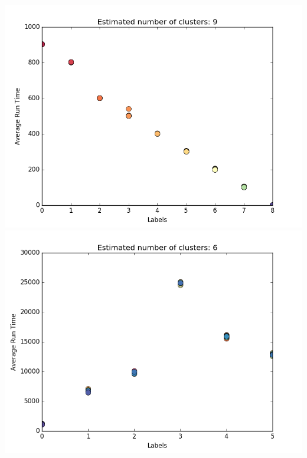 \documentclass{article}
\begin{document}
    \includegraphics[scale=0.2]{MSB1_10_100.png}
    \includegraphics[scale=0.2]{RegEx_20_10_1_101.png}
\end{document}
